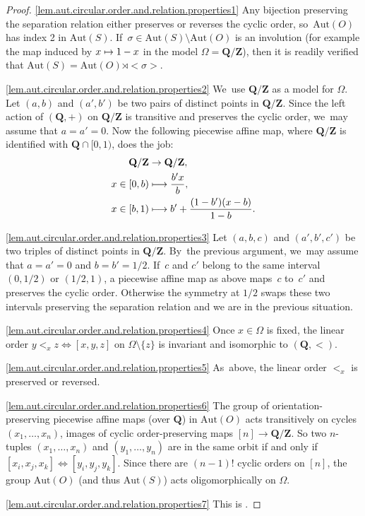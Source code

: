 \documentclass[JEP,XML,SOM,Unicode,NoFloatCountersInSection,published]{cedram}
\newcommand\mto{\mathchoice{\longmapsto}{\mapsto}{\mapsto}{\mapsto}}
\theoremstyle{plain}
\theoremstyle{definition}
\theoremstyle{remark}
\newcommand{\Aut}{\mathrm{Aut}}
\begin{document}
\skpt
\begin{proof}

\cref{lem.aut.circular.order.and.relation.properties1}
Any bijection preserving the separation relation either preserves or reverses the cyclic order, so~$\Aut(O)$ has index 2 in $\Aut(S)$. If~$\sigma\in\Aut(S)\setminus\Aut(O)$ is an involution (for example the map induced by $x\mto 1-x$ in the model $\Omega=\mathbf{Q}/\mathbf{Z}$), then it is readily verified that $\Aut(S) = \Aut(O)\rtimes<\sigma>$.

\cref{lem.aut.circular.order.and.relation.properties2}
We~use $\mathbf{Q}/\mathbf{Z}$ as a model for $\Omega$. Let $(a,b)$ and $(a',b')$ be two pairs of distinct points in $\mathbf{Q}/\mathbf{Z}$.
Since the left action of $(\mathbf{Q},+)$ on $\mathbf{Q}/\mathbf{Z}$ is transitive and preserves the cyclic order, we~may assume that $a=a'=0$. Now the following piecewise affine map, where $\mathbf{Q}/\mathbf{Z}$ is identified with $\mathbf{Q}\cap[0,1)$, does the job:
\begin{align*}
\mathbf{Q}/\mathbf{Z}&\to\mathbf{Q}/\mathbf{Z},\\
x\in[0,b)&\mto \frac{b'x}{b},\\
x\in[b,1)&\mto b'+\frac{(1-b')(x-b)}{1-b}.
\end{align*}

\cref{lem.aut.circular.order.and.relation.properties3}
Let $(a,b,c)$ and $(a',b',c')$ be two triples of distinct points in $\mathbf{Q}/\mathbf{Z}$. By~the previous argument, we~may assume that $a=a'=0$ and $b=b'=1/2$. If~$c$ and $c'$ belong to the same interval $(0,1/2)$ or $(1/2,1)$, a piecewise affine map as above maps~$c$ to~$c'$ and preserves the cyclic order.
Otherwise the symmetry at $1/2$ swaps these two intervals preserving the separation relation and we are in the previous situation.

\cref{lem.aut.circular.order.and.relation.properties4}
Once $x\in\Omega$ is fixed, the linear order $y<_xz\iff[x,y,z]$ on $\Omega\setminus\{z\}$ is invariant and isomorphic to $(\mathbf{Q},<)$.

\cref{lem.aut.circular.order.and.relation.properties5}
As~above, the linear order $<_x$ is preserved or reversed.

\cref{lem.aut.circular.order.and.relation.properties6}
The group of orientation-preserving piecewise affine maps (over $\mathbf{Q}$) in $\Aut(O)$ acts transitively on cycles $(x_1,\dots,x_n)$, \ie images of cyclic order-preserving maps $[n]\to\mathbf{Q}/\mathbf{Z}$.
So two $n$-tuples $(x_1,\dots,x_n)$ and $(y_1,\dots,y_n)$ are in the same orbit if and only if $[x_i,x_j,x_k]\iff[y_i,y_j,y_k]$.
Since there are $(n-1)!$ cyclic orders on $[n]$, the group $\Aut(O)$ (and thus $\Aut(S)$) acts oligomorphically on $\Omega$.

\cref{lem.aut.circular.order.and.relation.properties7}
This is \cite[Prop.\,4.2.8]{Macpherson}.
\end{proof}
\end{document}
